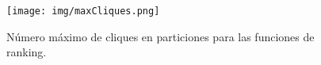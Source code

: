 \begin{figure}
    	\centering
    	\texttt{[image: img/maxCliques.png]}
    	
    \caption{Número máximo de cliques en particiones para las funciones de ranking.}
    \label{fig:maxCliques}
\end{figure}
